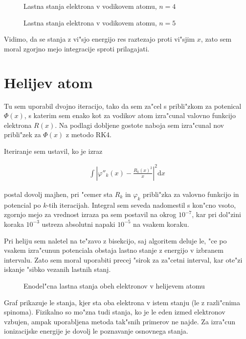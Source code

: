 \documentclass[a4paper,10pt]{article}
\newcommand{\dd}{\mathrm{d}}
\begin{document}
\begin{figure}[H]
 
 \caption{Lastna stanja elektrona v vodikovem atomu, $n = 4$}
 \label{fig:vodik-4}
\end{figure}

\begin{figure}[H]
 
 \caption{Lastna stanja elektrona v vodikovem atomu, $n = 5$}
 \label{fig:vodik-5}
\end{figure}

Vidimo, da se stanja z vi"sjo energijo res raztezajo proti vi"sjim $x$, zato sem moral zgorjno mejo integracije sproti prilagajati. 

\section{Helijev atom}

Tu sem uporabil dvojno iteracijo, tako da sem za"cel s pribli"zkom za potenical $\Phi(x)$, s katerim sem enako kot za vodikov atom izra"cunal valovno funkcijo elektrona $R(x)$. Na podlagi dobljene gostote naboja sem izra"cunal nov pribli"zek za $\Phi(x)$ z metodo RK4. 

Iteriranje sem ustavil, ko je izraz

\begin{align}
 \int \left|\varphi''_k(x) - \frac{R_k(x)^2}{x}\right|^2 \dd x
\end{align}

postal dovolj majhen, pri "cemer sta $R_k$ in $\varphi_k$ pribli"zka za valovno funkcijo in potencial po $k$-tih iteracijah. Integral sem seveda nadomestil s kon"cno vsoto, zgornjo mejo za vrednost izraza pa sem postavil na okrog $10^{-7}$, kar pri dol"zini koraka $10^{-3}$ ustreza absolutni napaki $10^{-5}$ na vsakem koraku. 

Pri heliju sem naletel na te"zavo z bisekcijo, saj algoritem deluje le, "ce po vsakem izra"cunun potenciala obstaja lastno stanje z energijo v izbranem intervalu. Zato sem moral uporabiti precej "sirok za za"cetni interval, kar ote"zi iskanje "sibko vezanih lastnih stanj. 

\begin{figure}[H]
 
 \caption{Enodel"cna lastna stanja obeh elektronov v helijevem atomu}
 \label{fig:helij}
\end{figure}

Graf prikazuje le stanja, kjer sta oba elektrona v istem stanju (le z razli"cnima spinoma). Fizikalno so mo"zna tudi stanja, ko je le eden izmed elektronov vzbujen, ampak uporabljena metoda tak"snih primerov ne najde. Za izra"cun ionizacijske energije je dovolj le poznavanje osnovnega stanja. 
\end{document}
